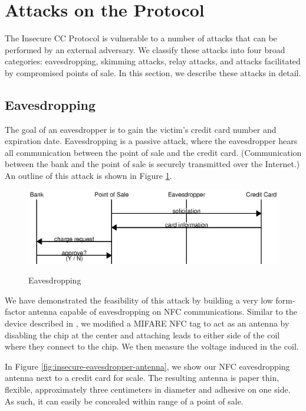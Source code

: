 \section{Attacks on the Protocol}
\label{sec:insecure-attacks}

The Insecure CC Protocol is vulnerable to a number of attacks that can be performed by an external adversary.
We classify these attacks into four broad categories:
    eavesdropping, skimming attacks, relay attacks, and attacks facilitated by compromised points of sale.
In this section, we describe these attacks in detail.


\subsection{Eavesdropping}
\label{sec:insecure-eavesdropper}
The goal of an eavesdropper is to gain the victim's credit card number and expiration date.
Eavesdropping is a passive attack, where the eavesdropper hears all communication between the point of sale and the credit card.
(Communication between the bank and the point of sale is securely transmitted over the Internet.)
An outline of this attack is shown in Figure \ref{fig:insecure-eavesdropper}.

\begin{figure}
  \caption{Eavesdropping}
  \centering
    \includegraphics{img/attack-3-eavesdrop.eps}
  \label{fig:insecure-eavesdropper}
\end{figure}

We have demonstrated the feasibility of this attack by building a very low form-factor antenna capable of eavesdropping on NFC communications.
Similar to the device described in \cite{kortvedt2009eavesdropping}, we modified a MIFARE NFC tag to act as an antenna by disabling the chip at the center and attaching leads to either side of the coil where they connect to the chip.
We then measure the voltage induced in the coil.

In Figure \ref{fig:insecure-eavesdropper-antenna}, we show our NFC eavesdropping antenna next to a credit card for scale.
The resulting antenna is paper thin, flexible, approximately three centimeters in diameter and adhesive on one side.
As such, it can easily be concealed within range of a point of sale.


